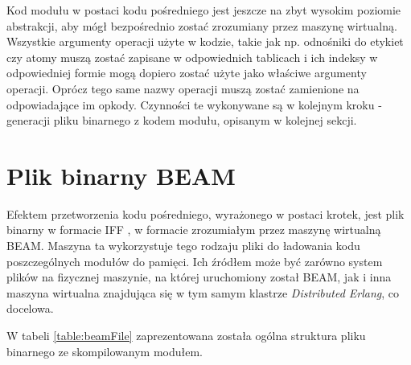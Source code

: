 Kod modułu w postaci kodu pośredniego jest jeszcze na zbyt wysokim poziomie abstrakcji, aby mógł bezpośrednio zostać zrozumiany przez maszynę wirtualną. Wszystkie argumenty operacji użyte w kodzie, takie jak np. odnośniki do etykiet czy atomy muszą zostać zapisane w odpowiednich tablicach i ich indeksy w odpowiedniej formie mogą dopiero zostać użyte jako właściwe argumenty operacji. Oprócz tego same nazwy operacji muszą zostać zamienione na odpowiadające im opkody. Czynności te wykonywane są w kolejnym kroku - generacji pliku binarnego z kodem modułu, opisanym w kolejnej sekcji.

\section{Plik binarny BEAM}

Efektem przetworzenia kodu pośredniego, wyrażonego w postaci krotek, jest plik binarny w formacie IFF \cite{morrison1985ea}, w formacie zrozumiałym przez maszynę wirtualną BEAM. Maszyna ta wykorzystuje tego rodzaju pliki do ładowania kodu poszczególnych modułów do pamięci. Ich źródłem może być zarówno system plików na fizycznej maszynie, na której uruchomiony został BEAM, jak i inna maszyna wirtualna znajdująca się w tym samym klastrze \emph{Distributed Erlang}, co docelowa.

W tabeli \ref{table:beamFile} zaprezentowana została ogólna struktura pliku binarnego ze skompilowanym modułem.


